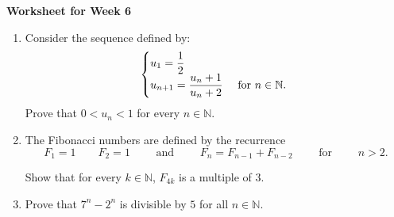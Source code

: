 \documentclass[12pt]{article}
\begin{document}
\centerline{\bf\large Worksheet for Week 6}

\vspace{25pt}


\begin{enumerate}

\item Consider the sequence defined by:
$$\begin{cases} u_1=\dfrac{1}{2}&\cr
u_{n+1}= \dfrac{u_n+1}{u_n+2}&\textrm{ for $n\in\mathbb N.$ }
\end{cases}$$
Prove that $0<u_n<1$ for every $n\in \mathbb N$.

%
%
%
%
%
%
%


\item     The Fibonacci numbers are defined by the recurrence
$$F_1 = 1 \qquad F_2 = 1 \qquad \text{ and }\qquad F_n = F_{n - 1} + F_{n - 2}\qquad \text{ for }\qquad n > 2.$$	


Show that for every $k \in \mathbb{N}$, $F_{4k}$ is a multiple of $3$.

%
%
%
%
%

\item Prove that $7^n-2^n$ is divisible by $5$ for all $n\in\mathbb N$.


\end{enumerate}
\end{document}
